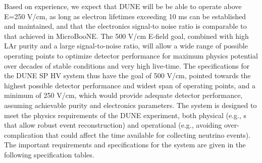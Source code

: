 Based on experience, we expect that DUNE will be be able to operate  above E=250 V/cm, 
as long as electron lifetimes exceeding 10 ms can be established and maintained, %
and that the electronics signal-to noise ratio is comparable to that achieved in MicroBooNE. 
The 500 V/cm E-field goal, combined with high LAr purity and a large signal-to-noise ratio, will allow  a wide range of possible operating points to optimize detector performance for maximum physics potential over decades of stable conditions and very high live-time. 
The specifications for the DUNE SP HV system thus have the goal of 500 V/cm, pointed  towards the highest possible detector performance and widest span of operating points, and a minimum of 250 V/cm, which would provide adequate detector performance, assuming achievable purity and electronics parameters.
The  system is designed to meet the physics requirements of the DUNE experiment,  both physical  (e.g., \efield{}s that allow robust event reconstruction) and operational (e.g., avoiding over-complication that could affect %
the time available for collecting neutrino events). %
The important requirements and specifications for the  system are given in the following specification tables.  


